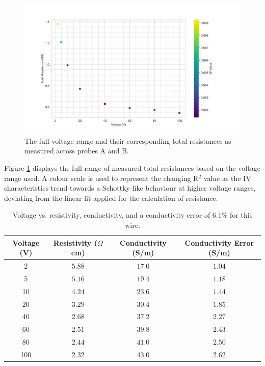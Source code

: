 \begin{refsection}
\begin{figure}[H]
    \centering
    \includegraphics[width=\linewidth]{Chapter7/Figs/Raster/full_range AB.png}
    \caption{The full voltage range and their corresponding total resistances as measured across probes A and B.}
    \label{fig:full_range_ab}
\end{figure}

Figure \ref{fig:full_range_ab} displays the full range of measured total resistances based on the voltage range used. A colour scale is used to represent the changing R$^{2}$ value as the IV characteristics trend towards a Schottky-like behaviour at higher voltage ranges, deviating from the linear fit applied for the calculation of resistance.

\begin{table}[ht]
\centering
\begin{tabular}{|c|c|c|c|}
\hline
Voltage (V) & Resistivity ($\Omega$cm) & Conductivity (S/m) & Conductivity Error (S/m) \\
\hline
2 & $5.88$ & $17.0$ & $1.04$ \\
5 & $5.16$ & $19.4$ & $1.18$ \\
10 & $4.24$ & $23.6$ & $1.44$ \\
20 & $3.29$ & $30.4$ & $1.85$ \\
40 & $2.68$ & $37.2$ & $2.27$ \\
60 & $2.51$ & $39.8$ & $2.43$ \\
80 & $2.44$ & $41.0$ & $2.50$ \\
100& $2.32$ & $43.0$ & $2.62$ \\
\hline
\end{tabular}
\caption{Voltage vs. resistivity, conductivity, and a conductivity error of 6.1\% for this wire.}
\label{table:ab_resistivity_conductivity}
\end{table}


\end{refsection}
